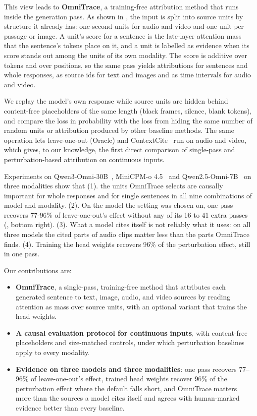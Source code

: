 This view leads to \textbf{OmniTrace}, a training-free attribution method that runs inside the generation pass. 
As shown in , the input is split into source units by structure it already has: one-second units for audio and video and one unit per passage or image.
A unit's score for a sentence is the late-layer attention mass that the sentence's tokens place on it, and a unit is labelled as evidence when its score stands out among the units of its own modality.
The score is additive over tokens and over positions, so the same pass yields attributions for sentences and whole responses, as source ids for text and images and as time intervals for audio and video.

We replay the model's own response while source units are hidden behind content-free placeholders of the same length (black frames, silence, blank tokens), and compare the loss in probability with the loss from hiding the same number of random units or attribution produced by other baseline methods.
The same operation lets leave-one-out (Oracle) and ContextCite~\cite{cohen-wang2024contextcite} run on audio and video, which gives, to our knowledge, the first direct comparison of single-pass and perturbation-based attribution on continuous inputs.

Experiments on Qwen3-Omni-30B~\cite{Xu2025Qwen3OmniTR}, MiniCPM-o 4.5~\cite{cui2026minicpm} and Qwen2.5-Omni-7B~\cite{xu2025qwen2} on three modalities show that (1). the units OmniTrace selects are causally important for whole responses and for single sentences in all nine combinations of model and modality.
(2). On the model the setting was chosen on, one pass recovers 77-96\% of leave-one-out's effect without any of its 16 to 41 extra passes (, bottom right).
(3). What a model cites itself is not reliably what it uses: on all three models the cited parts of audio clips matter less than the parts OmniTrace finds.
(4). Training the head weights recovers 96\% of the perturbation effect, still in one pass.

Our contributions are:
\begin{itemize}
    \item \textbf{OmniTrace}, a single-pass, training-free method that attributes each generated sentence to text, image, audio, and video sources by reading attention as mass over source units, with an optional variant that trains the head weights.
    \item \textbf{A causal evaluation protocol for continuous inputs}, with content-free placeholders and size-matched controls, under which perturbation baselines apply to every modality.
    \item \textbf{Evidence on three models and three modalities}: one pass recovers 77--96\% of leave-one-out's effect, trained head weights recover 96\% of the perturbation effect where the default falls short, and OmniTrace matters more than the sources a model cites itself and agrees with human-marked evidence better than every baseline.
\end{itemize}
